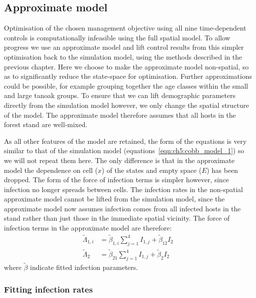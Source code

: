 \subsection{Approximate model}

Optimisation of the chosen management objective using all nine time-dependent controls is computationally infeasible using the full spatial model. To allow progress we use an approximate model and lift control results from this simpler optimisation back to the simulation model, using the methods described in the previous chapter. Here we choose to make the approximate model non-spatial, so as to significantly reduce the state-space for optimisation. Further approximations could be possible, for example grouping together the age classes within the small and large tanoak groups. To ensure that we can lift demographic parameters directly from the simulation model however, we only change the spatial structure of the model. The approximate model therefore assumes that all hosts in the forest stand are well-mixed.

As all other features of the model are retained, the form of the equations is very similar to that of the simulation model (equations~\ref{eqn:ch5:cobb_model_1}) so we will not repeat them here. The only difference is that in the approximate model the dependence on cell ($x$) of the states and empty space ($E$) has been dropped. The form of the force of infection terms is simpler however, since infection no longer spreads between cells. The infection rates in the non-spatial approximate model cannot be lifted from the simulation model, since the approximate model now assumes infection comes from all infected hosts in the stand rather than just those in the immediate spatial vicinity. The force of infection terms in the approximate model are therefore:
\begin{subequations}\label{eqn:ch5:infection_approx}
        \begin{align}
            \tilde{\Lambda}_{1,i} &= \tilde{\beta}_{1,i}\sum_{j=1}^4I_{1,j} + \tilde{\beta}_{12}I_{2} \\
            \tilde{\Lambda}_{2} &= \tilde{\beta}_{21}\sum_{j=1}^4I_{1,j} + \tilde{\beta}_{2}I_{2}
        \end{align}
\end{subequations}
where $\tilde{\beta}$ indicate fitted infection parameters.

\subsubsection{Fitting infection rates}

